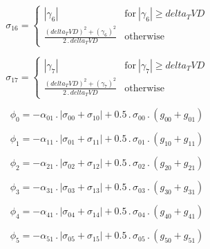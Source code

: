 \documentclass{article}
\begin{document}
\begin{dmath}\sigma_{1 6} = \begin{cases} \left|{\gamma_{6}}\right| & \text{for}\: \left|{\gamma_{6}}\right| \geq delta_TVD \\\frac{\left(delta_TVD \right)^{2} + \left(\gamma_{6} \right)^{2}}{2 \,.\, delta_TVD} & \text{otherwise} 
\end{cases}\end{dmath}

\begin{dmath}\sigma_{1 7} = \begin{cases} \left|{\gamma_{7}}\right| & \text{for}\: \left|{\gamma_{7}}\right| \geq delta_TVD \\\frac{\left(delta_TVD \right)^{2} + \left(\gamma_{7} \right)^{2}}{2 \,.\, delta_TVD} & \text{otherwise} 
\end{cases}\end{dmath}

\begin{dmath}\phi_{0} = - \alpha_{01} \,.\, \left|{\sigma_{0 0} + \sigma_{1 0}}\right| + 0.5 \,.\, \sigma_{0 0} \,.\, \left(g_{00} + g_{01}\right)\end{dmath}

\begin{dmath}\phi_{1} = - \alpha_{11} \,.\, \left|{\sigma_{0 1} + \sigma_{1 1}}\right| + 0.5 \,.\, \sigma_{0 1} \,.\, \left(g_{10} + g_{11}\right)\end{dmath}

\begin{dmath}\phi_{2} = - \alpha_{21} \,.\, \left|{\sigma_{0 2} + \sigma_{1 2}}\right| + 0.5 \,.\, \sigma_{0 2} \,.\, \left(g_{20} + g_{21}\right)\end{dmath}

\begin{dmath}\phi_{3} = - \alpha_{31} \,.\, \left|{\sigma_{0 3} + \sigma_{1 3}}\right| + 0.5 \,.\, \sigma_{0 3} \,.\, \left(g_{30} + g_{31}\right)\end{dmath}

\begin{dmath}\phi_{4} = - \alpha_{41} \,.\, \left|{\sigma_{0 4} + \sigma_{1 4}}\right| + 0.5 \,.\, \sigma_{0 4} \,.\, \left(g_{40} + g_{41}\right)\end{dmath}

\begin{dmath}\phi_{5} = - \alpha_{51} \,.\, \left|{\sigma_{0 5} + \sigma_{1 5}}\right| + 0.5 \,.\, \sigma_{0 5} \,.\, \left(g_{50} + g_{51}\right)\end{dmath}
\end{document}
